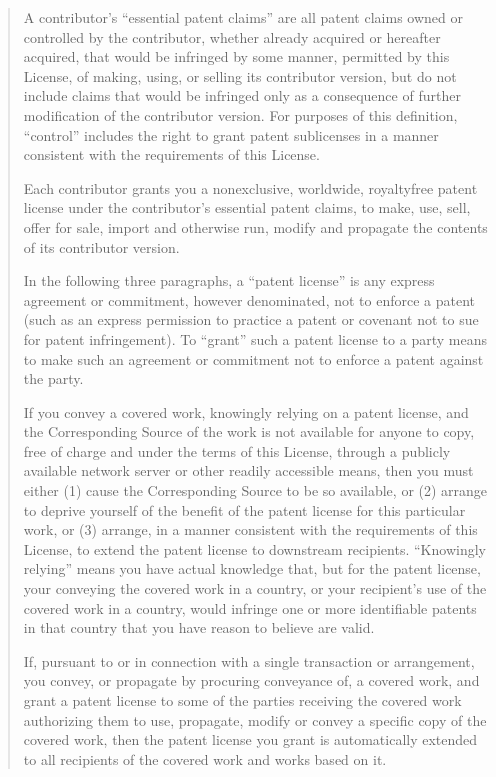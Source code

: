 \documentclass[letterpaper,10pt,english]{sphinxmanual}
\begin{document}
\begin{quote}
A contributor’s “essential patent claims” are all patent claims owned or controlled by the contributor, whether already acquired or hereafter acquired, that would be infringed by some manner, permitted by this License, of making, using, or selling its contributor version, but do not include claims that would be infringed only as a consequence of further modification of the contributor version. For purposes of this definition, “control” includes the right to grant patent sublicenses in a manner consistent with the requirements of this License.

Each contributor grants you a non\sphinxhyphen{}exclusive, worldwide, royalty\sphinxhyphen{}free patent license under the contributor’s essential patent claims, to make, use, sell, offer for sale, import and otherwise run, modify and propagate the contents of its contributor version.

In the following three paragraphs, a “patent license” is any express agreement or commitment, however denominated, not to enforce a patent (such as an express permission to practice a patent or covenant not to sue for patent infringement). To “grant” such a patent license to a party means to make such an agreement or commitment not to enforce a patent against the party.

If you convey a covered work, knowingly relying on a patent license, and the Corresponding Source of the work is not available for anyone to copy, free of charge and under the terms of this License, through a publicly available network server or other readily accessible means, then you must either (1) cause the Corresponding Source to be so available, or (2) arrange to deprive yourself of the benefit of the patent license for this particular work, or (3) arrange, in a manner consistent with the requirements of this License, to extend the patent license to downstream recipients. “Knowingly relying” means you have actual knowledge that, but for the patent license, your conveying the covered work in a country, or your recipient’s use of the covered work in a country, would infringe one or more identifiable patents in that country that you have reason to believe are valid.

If, pursuant to or in connection with a single transaction or arrangement, you convey, or propagate by procuring conveyance of, a covered work, and grant a patent license to some of the parties receiving the covered work authorizing them to use, propagate, modify or convey a specific copy of the covered work, then the patent license you grant is automatically extended to all recipients of the covered work and works based on it.


\end{quote}
\end{document}
